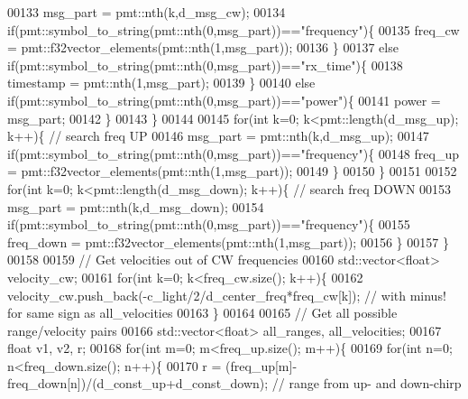 \begin{DoxyCode}
00133             msg\_part = pmt::nth(k,d_msg_cw);
00134             \textcolor{keywordflow}{if}(pmt::symbol\_to\_string(pmt::nth(0,msg\_part))==\textcolor{stringliteral}{"frequency"})\{
00135                 freq\_cw = pmt::f32vector\_elements(pmt::nth(1,msg\_part));
00136             \}
00137             \textcolor{keywordflow}{else} \textcolor{keywordflow}{if}(pmt::symbol\_to\_string(pmt::nth(0,msg\_part))==\textcolor{stringliteral}{"rx\_time"})\{
00138                 timestamp = pmt::nth(1,msg\_part);
00139             \}
00140             \textcolor{keywordflow}{else} \textcolor{keywordflow}{if}(pmt::symbol\_to\_string(pmt::nth(0,msg\_part))==\textcolor{stringliteral}{"power"})\{
00141                 power = msg\_part;
00142             \}
00143         \}
00144         
00145         \textcolor{keywordflow}{for}(\textcolor{keywordtype}{int} k=0; k<pmt::length(d_msg_up); k++)\{ \textcolor{comment}{// search freq UP}
00146             msg\_part = pmt::nth(k,d_msg_up);
00147             \textcolor{keywordflow}{if}(pmt::symbol\_to\_string(pmt::nth(0,msg\_part))==\textcolor{stringliteral}{"frequency"})\{
00148                 freq\_up = pmt::f32vector\_elements(pmt::nth(1,msg\_part));
00149             \}
00150         \}
00151         
00152         \textcolor{keywordflow}{for}(\textcolor{keywordtype}{int} k=0; k<pmt::length(d_msg_down); k++)\{ \textcolor{comment}{// search freq DOWN}
00153             msg\_part = pmt::nth(k,d_msg_down);
00154             \textcolor{keywordflow}{if}(pmt::symbol\_to\_string(pmt::nth(0,msg\_part))==\textcolor{stringliteral}{"frequency"})\{
00155                 freq\_down = pmt::f32vector\_elements(pmt::nth(1,msg\_part));
00156             \}
00157         \}
00158         
00159         \textcolor{comment}{// Get velocities out of CW frequencies}
00160         std::vector<float> velocity\_cw;
00161         \textcolor{keywordflow}{for}(\textcolor{keywordtype}{int} k=0; k<freq\_cw.size(); k++)\{
00162             velocity\_cw.push\_back(-c_light/2/d_center_freq*freq\_cw[k]); \textcolor{comment}{// with minus! for same sign as
       all\_velocities}
00163         \}
00164         
00165         \textcolor{comment}{// Get all possible range/velocity pairs}
00166         std::vector<float> all\_ranges, all\_velocities;
00167         \textcolor{keywordtype}{float} v1, v2, r;
00168         \textcolor{keywordflow}{for}(\textcolor{keywordtype}{int} m=0; m<freq\_up.size(); m++)\{
00169             \textcolor{keywordflow}{for}(\textcolor{keywordtype}{int} n=0; n<freq\_down.size(); n++)\{
00170                 r = (freq\_up[m]-freq\_down[n])/(d_const_up+d_const_down); \textcolor{comment}{// range from up- and down-chirp}

\end{DoxyCode}
